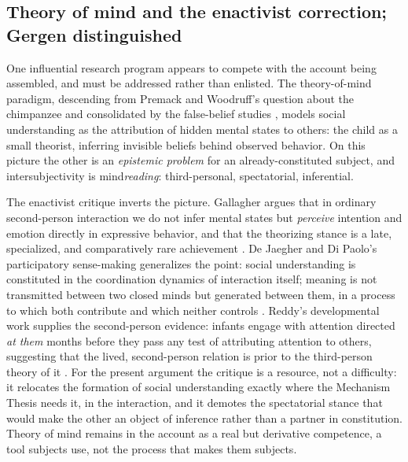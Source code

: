 \documentclass[11pt,a4paper]{article}
\theoremstyle{seriesthm}
\begin{document}
\subsection{Theory of mind and the enactivist correction; Gergen distinguished}
\label{p05:sec:gergen}

One influential research program appears to compete with the account being assembled, and must be addressed rather than enlisted. The theory-of-mind paradigm, descending from Premack and Woodruff's question about the chimpanzee \parencite{premack1978} and consolidated by the false-belief studies \parencite{baroncohen1985}, models social understanding as the attribution of hidden mental states to others: the child as a small theorist, inferring invisible beliefs behind observed behavior. On this picture the other is an \emph{epistemic problem} for an already-constituted subject, and intersubjectivity is mind\emph{reading}: third-personal, spectatorial, inferential.

The enactivist critique inverts the picture. Gallagher argues that in ordinary second-person interaction we do not infer mental states but \emph{perceive} intention and emotion directly in expressive behavior, and that the theorizing stance is a late, specialized, and comparatively rare achievement \parencite{gallagher2008}. De Jaegher and Di Paolo's participatory sense-making generalizes the point: social understanding is constituted in the coordination dynamics of interaction itself; meaning is not transmitted between two closed minds but generated between them, in a process to which both contribute and which neither controls \parencite{dejaegher2007}. Reddy's developmental work supplies the second-person evidence: infants engage with attention directed \emph{at them} months before they pass any test of attributing attention to others, suggesting that the lived, second-person relation is prior to the third-person theory of it \parencite{reddy2008}. For the present argument the critique is a resource, not a difficulty: it relocates the formation of social understanding exactly where the Mechanism Thesis needs it, in the interaction, and it demotes the spectatorial stance that would make the other an object of inference rather than a partner in constitution. Theory of mind remains in the account as a real but derivative competence, a tool subjects use, not the process that makes them subjects.
\end{document}

